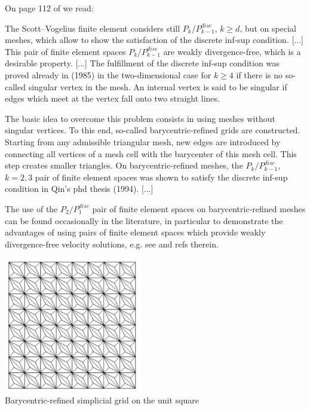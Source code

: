 On page 112 of \textcite{john16} we read:
\begin{displayquote}
{\color{darkgray}
The Scott–Vogelius finite element considers still $P_k/P^{disc}_{k-1}$, $k \ge d$, 
but on special meshes, which allow to show the satisfaction of the 
discrete inf-sup condition.
[...]
This pair of finite element spaces $P_k/P^{disc}_{k-1}$
are weakly divergence-free, which is a desirable property.
[...]
The fulfillment of the discrete inf-sup condition 
was proved already in \textcite{scvo85} (1985) in the two-dimensional 
case for $k\ge 4$ if there is no so-called singular vertex in the mesh.
An internal vertex is said to be singular if edges which meet at the vertex fall onto
two straight lines.

The basic idea to overcome this problem consists in using meshes 
without singular vertices. To this end, so-called barycentric-refined 
grids are constructed. Starting from any admissible triangular mesh, 
new edges are introduced by connecting all
vertices of a mesh cell with the barycenter of this mesh cell. 
This step creates smaller triangles.
On barycentric-refined meshes, the $P_k/P^{disc}_{k-1}$, $k=2,3$ 
pair of finite element spaces was shown to satisfy the discrete inf-sup
condition in Qin's phd thesis (1994). [...]

The use of the $P_2/P^{disc}_{1}$ pair of finite element spaces 
on barycentric-refined meshes can be found occasionally in the literature,
in particular to demonstrate the advantages of using pairs of finite element 
spaces which provide weakly divergence-free velocity solutions, 
e.g. see \textcite{john15} and refs therein.

}
\end{displayquote}


\begin{center}
\includegraphics[width=6cm]{images/pair_scott_vogelius/john16}\\
{\captionfont Barycentric-refined simplicial grid on the unit square}
\end{center}

